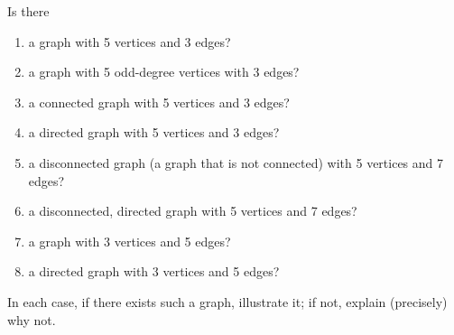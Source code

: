 \documentclass[10pt]{article}
\newenvironment{problem}[2][Problem]{\begin{trivlist}
\item[\hskip \labelsep {\bfseries #1}\hskip \labelsep {\bfseries #2.}]}{\end{trivlist}}
\begin{document}
\pagebreak
\pagebreak
\newpage
\clearpage
\begin{problem}{3}
Is there
\begin{enumerate}[label=(\alph*)]
    \parskip=0in
    \parsep=0in
    \itemsep=0.1in
    \item a graph with 5 vertices and 3 edges?
    \item a graph with 5 odd-degree vertices with 3 edges?
    \item a connected graph with 5 vertices and 3 edges?
    \item a directed graph with 5 vertices and 3 edges?
    \item a disconnected graph (a graph that is not connected) with 5
vertices and 7 edges?
    \item a disconnected, directed graph with 5 vertices and 7 edges?
    \item a graph with 3 vertices and 5 edges?
    \item a directed graph with 3 vertices and 5 edges?
\end{enumerate}

In each case, if there exists such a graph, illustrate it; if not, explain (precisely) why not.
\end{problem}
\end{document}
